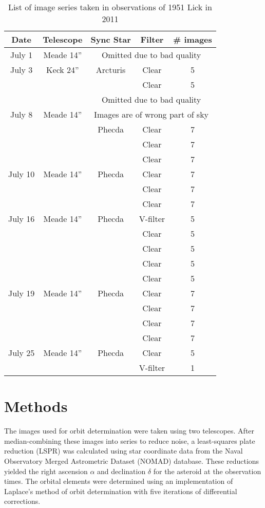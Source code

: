 \documentclass[12pt,journal,compsoc]{IEEEtran}
\begin{document}
\begin{table}[!t]
\centering
\begin{tabular}{|c|c|c|c|c|}
\hline
Date & Telescope & Sync Star & Filter & \# images \\ \hline \hline
July 1 &Meade 14''& \multicolumn{3}{c|}{Omitted due to bad quality}\\ \hline \hline
July 3 & Keck 24''& Arcturis & Clear & 5 \\ \cline{4-5}
 & & & Clear & 5\\ \cline{3-5}
 & & \multicolumn{3}{c|}{Omitted due to bad quality} \\ \hline \hline
July 8 & Meade 14'' &\multicolumn{3}{c|}{Images are of wrong part of sky} \\ \cline{3-5}
 & & Phecda & Clear & 7 \\ \cline{4-5}
 & & & Clear & 7\\ \cline{4-5}
 & & & Clear & 7\\ \hline \hline
July 10 & Meade 14''& Phecda & Clear &7 \\ \cline{4-5}
 & & & Clear & 7\\ \cline{4-5}
 & & & Clear & 7\\ \hline \hline
July 16 & Meade 14''& Phecda & V-filter &5 \\ \cline{4-5}
 & & & Clear & 5\\ \cline{4-5}
 & & & Clear & 5\\ \cline{4-5}
 & & & Clear & 5\\ \cline{4-5}
 & & & Clear & 5\\ \hline \hline
July 19 & Meade 14''& Phecda & Clear &7 \\ \cline{4-5}
 & & & Clear & 7\\ \cline{4-5}
 & & & Clear & 7\\ \cline{4-5}
 & & & Clear & 7\\ \hline \hline
July 25 & Meade 14'' & Phecda & Clear &5 \\ \cline{4-5}
 & & & V-filter & 1\\ \hline
\end{tabular}
\caption{List of image series taken in observations of 1951 Lick in 2011\label{tab:serieslist}}
\end{table}

\section{Methods}
The images used for orbit determination were taken using two telescopes.
After median-combining these images into series to reduce noise, 
a least-squares plate reduction (LSPR) was calculated
using star coordinate data from the Naval Observatory Merged Astrometric Dataset (NOMAD) database. 
These reductions yielded the right ascension $\alpha$ and declination $\delta$ for the asteroid at the observation times.
The orbital elements were determined using an implementation of Laplace's method of orbit determination 
with five iterations of differential corrections.
\end{document}
